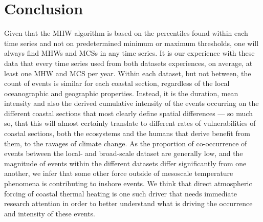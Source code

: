 \documentclass[a4paper,10pt,review]{elsarticle}
\begin{document}
\section{Conclusion}
Given that the MHW algorithm is based on the percentiles found within each time series and not on predetermined minimum or maximum thresholds, one will always find MHWs and MCSs in any time series. It is our experience with these data that every time series used from both datasets experiences, on average, at least one MHW and MCS per year. Within each dataset, but not between, the count of events is similar for each coastal section, regardless of the local oceanographic and geographic properties. Instead, it is the duration, mean intensity and also the derived cumulative intensity of the events occurring on the different coastal sections that most clearly define spatial differences --- so much so, that this will almost certainly translate to different rates of vulnerabilities of coastal sections, both the ecosystems and the humans that derive benefit from them, to the ravages of climate change. As the proportion of co-occurrence of events between the local- and broad-scale dataset are generally low, and the magnitude of events within the different datasets differ significantly from one another, we infer that some other force outside of mesoscale temperature phenomena is contributing to inshore events. We think that direct atmospheric forcing of coastal thermal heating is one such driver that needs immediate research attention in order to better understand what is driving the occurrence and intensity of these events.
\end{document}
